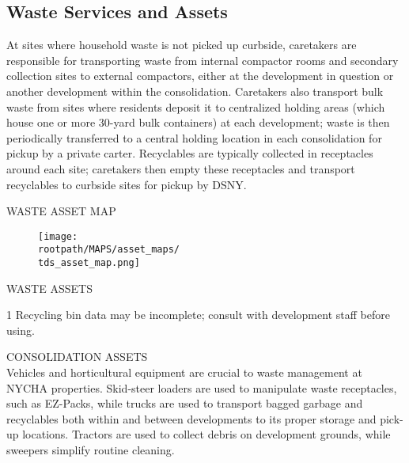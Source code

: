 \sffamily
{}
\textcolor{ccorange}{\section{Waste Services and Assets}}
At sites where household waste is not picked up curbside, caretakers are responsible for transporting waste from internal compactor rooms and secondary collection sites to external compactors, either at the development in question or another development within the consolidation. Caretakers also transport bulk waste from sites where residents deposit it to centralized holding areas (which house one or more 30-yard bulk containers) at each development; waste is then periodically transferred to a central holding location in each consolidation for pickup by a private carter. Recyclables are typically collected in receptacles around each site; caretakers then empty these receptacles and transport recyclables to curbside sites for pickup by DSNY.
\pagecolor{white}
\begin{table}[H]
\small



\end{table}

\pagebreak

\textcolor{ccorange}{WASTE ASSET MAP}
\begin{figure}[H]
\raggedright
\texttt{[image: \\rootpath/MAPS/asset\_maps/\\tds\_asset\_map.png]}
\end{figure}
\pagebreak

\textcolor{ccorange}{WASTE ASSETS}

\begin{table}[H]
\begin{threeparttable}
\small



\begin{tablenotes}
\item [1] Recycling bin data may be incomplete; consult with development staff before using.
\end{tablenotes}
\end{threeparttable}
\end{table}

\textcolor{ccorange}{CONSOLIDATION ASSETS}\\
Vehicles and horticultural equipment are crucial to waste management at NYCHA properties. Skid-steer loaders are used to manipulate waste receptacles, such as EZ-Packs, while trucks are used to transport bagged garbage and recyclables both within and between developments to its proper storage and pick-up locations. Tractors are used to collect debris on development grounds, while sweepers simplify routine cleaning.
\begin{table}[H]

\end{table}
\pagebreak

